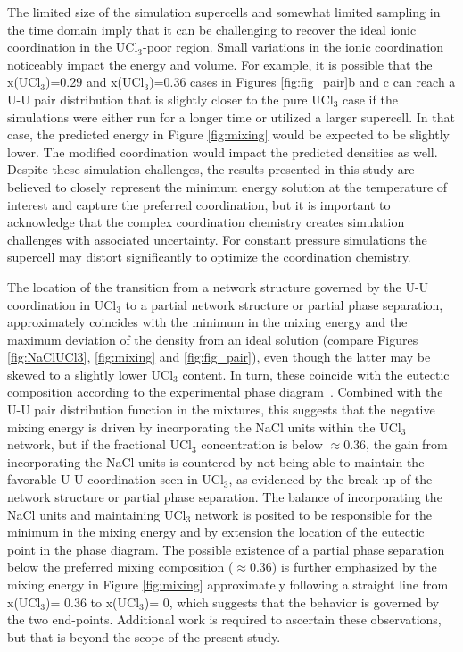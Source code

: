 \documentclass[preprint,3p,10pt,onecolumn,number,sort&compress]{elsarticle}
\begin{document}
The limited size of the simulation supercells and somewhat limited sampling in the time domain imply that it can be challenging to recover the ideal ionic coordination in the UCl$_3$-poor region. Small variations in the ionic coordination noticeably impact the energy and volume. For example, it is possible that the x(UCl$_3$)=0.29 and x(UCl$_3$)=0.36 cases in Figures \ref{fig:fig_pair}b and c can reach a U-U pair distribution that is slightly closer to the pure UCl$_3$ case if the simulations were either run for a longer time or utilized a larger supercell. In that case, the predicted energy in Figure \ref{fig:mixing} would be expected to be slightly lower. The modified coordination would impact the predicted densities as well. Despite these simulation challenges, the results presented in this study are believed to closely represent the minimum energy solution at the temperature of interest and capture the preferred coordination, but it is important to acknowledge that the complex coordination chemistry creates simulation challenges with associated uncertainty. For constant pressure simulations the supercell may distort significantly to optimize the coordination chemistry.

The location of the transition from a network structure governed by the U-U coordination in UCl$_3$ to a partial network structure or partial phase separation, approximately coincides with the minimum in the mixing energy and the maximum deviation of the density from an ideal solution (compare Figures \ref{fig:NaClUCl3}, \ref{fig:mixing} and \ref{fig:fig_pair}), even though the latter may be skewed to a slightly lower UCl$_3$ content. In turn, these coincide with the eutectic composition according to the experimental phase diagram~\cite{YIN2020}. Combined with the U-U pair distribution function in the mixtures, this suggests that the negative mixing energy is driven by incorporating the NaCl units within the UCl$_3$ network, 
but if the fractional UCl$_3$ concentration is below $\approx0.36$, the gain from incorporating the NaCl units is countered by not being able to maintain the favorable U-U coordination seen in UCl$_3$, as evidenced by the break-up of the network structure or partial phase separation. The balance of incorporating the  NaCl units and maintaining UCl$_3$ network is posited to be responsible for the minimum in the mixing energy and by extension the location of the eutectic point in the phase diagram. The possible existence of a partial phase separation below the preferred mixing composition ($\approx 0.36$) is further emphasized by the mixing energy in Figure \ref{fig:mixing} approximately following a straight line from x(UCl$_3$)= 0.36 to x(UCl$_3$)= 0, which suggests that the behavior is governed by the two end-points. Additional work is required to ascertain these observations, but that is beyond the scope of the present study.
\end{document}
